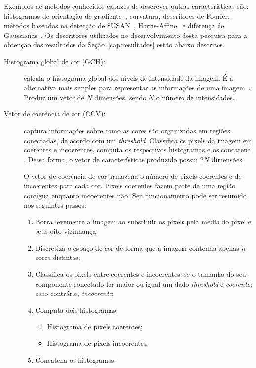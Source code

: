 Exemplos de métodos conhecidos capazes de descrever outras características são: histogramas de orientação de gradiente~\cite{Wang2009}, curvatura, descritores de Fourier, métodos baseados na detecção de SUSAN~\cite{Smith1997}, Harris-Affine~\cite{Han2005b} e diferença de Gaussianas~\cite{Lowe2004a}. Os descritores utilizados no desenvolvimento desta pesquisa para a obtenção dos resultados da Seção~\ref{cap:resultados} estão abaixo descritos.

\begin{description}
\item[Histograma global de cor (GCH):] calcula o histograma global dos níveis de intensidade da imagem. É a alternativa mais simples para representar as informações de uma imagem~\cite{Gonzalez2007}. Produz um vetor de $N$ dimensões, sendo $N$ o número de intensidades.

\item[Vetor de coerência de cor (CCV):] captura informações sobre como as cores são organizadas em regiões conectadas, de acordo com um \textit{threshold}. Classifica os pixels da imagem em coerentes e incoerentes, computa os respectivos histogramas e os concatena \cite{ccv}. Dessa forma, o vetor de características produzido possui $2N$ dimensões.

O vetor de coerência de cor armazena o número de pixels coerentes e de incoerentes para cada cor. Pixels coerentes fazem parte de uma região contígua enquanto incoerentes não. Seu funcionamento pode ser resumido nos seguintes passos:

\begin{enumerate}
  \item Borra levemente a imagem ao substituir os pixels pela média do pixel e seus oito vizinhança;
  \item Discretiza o espaço de cor de forma que a imagem contenha apenas $n$ cores distintas;
  \item Classifica os pixels entre coerentes e incoerentes: se o tamanho do seu componente conectado for maior ou igual um dado \textit{threshold} é \emph{coerente}; caso contrário, \emph{incoerente};
  \item Computa dois histogramas:
  \begin{itemize}
    \item Histograma de pixels coerentes;
    \item Histograma de pixels incoerentes.
  \end{itemize}
  \item Concatena os histogramas.
\end{enumerate}


\end{description}
